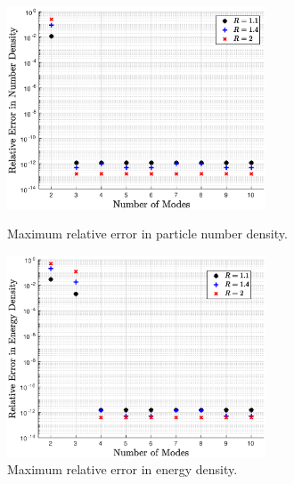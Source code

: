 \begin{figure}[ht]
\begin{minipage}[b]{0.5\linewidth}
\centerline{\includegraphics[height=6.0cm]{06-appendix/SpectralMethodBoltzmann/Figures/free_stream_num_err.eps}}
\caption{Maximum relative error in particle number density.}\label{fig:free_stream_num_err}
 \end{minipage}
 \hspace{0.5cm}
 \begin{minipage}[b]{0.5\linewidth}
\centerline{\includegraphics[height=6.0cm]{06-appendix/SpectralMethodBoltzmann/Figures/free_stream_E_err.eps}}
\caption{Maximum relative error in energy density.}\label{fig:free_stream_E_err}
\end{minipage}
\end{figure}

